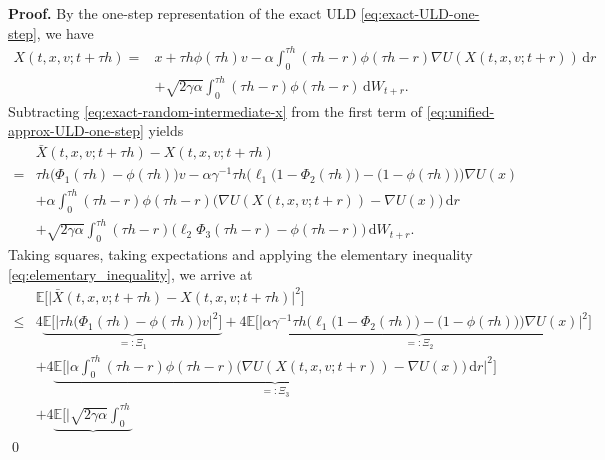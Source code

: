 \documentclass[12pt]{article}
\numberwithin{equation}{section}
\renewenvironment{proof}%
  {\begin{trivlist}%
   \item[]\ignorespaces}%
  {\qed\end{trivlist}}
\newcommand{\dd}{\mathrm{d}}
\begin{document}
\begin{proof}
\textbf{Proof.}
By the one-step representation of the exact ULD \eqref{eq:exact-ULD-one-step}, we have
\begin{equation}
\label{eq:exact-random-intermediate-x}
\begin{aligned}
X(t,x,v;t+\tau h)
=   &
x
+
\tau h\phi(\tau h)v
-
\alpha
\int_0^{\tau h}
(\tau h-r)\phi(\tau h-r)
\nabla U(X(t,x,v;t+r))\,\dd r
\\   &
+
\sqrt{2\gamma\alpha}
\int_0^{\tau h}
(\tau h-r)\phi(\tau h-r)\,\dd W_{t+r}.
\end{aligned}
\end{equation}
Subtracting \eqref{eq:exact-random-intermediate-x} from the first term of \eqref{eq:unified-approx-ULD-one-step} yields
\begin{equation}
\label{eq:delta-tau-x-decomposition}
\begin{aligned}
&
\bar X(t,x,v;t+\tau h)
-
X(t,x,v;t+\tau h)
\\
=&
\tau h
\big(
\Phi_1(\tau h)-\phi(\tau h)
\big)v
-
\alpha
\gamma^{-1}
\tau h
\Big(
\ell_1
\big(
1-\Phi_2(\tau h)
\big)
-
\big(
1-\phi(\tau h)
\big)
\Big)
\nabla U(x)
\\
&+
\alpha
\int_0^{\tau h}
(\tau h-r)\phi(\tau h-r)
\big(
\nabla U(X(t,x,v;t+r))-\nabla U(x)
\big)\,\dd r
\\
&+
\sqrt{2\gamma\alpha}
\int_0^{\tau h}
(\tau h-r)
\big(
\ell_2\Phi_3(\tau h-r)-\phi(\tau h-r)
\big)\,\dd W_{t+r}.
\end{aligned}
\end{equation}
Taking squares, taking expectations and applying the elementary inequality \eqref{eq:elementary_inequality}, we arrive at
\begin{align}
\label{eq:delta-tau-x-four-terms}
&
\mathbb E
\Big[
\big|
\bar X(t,x,v;t+\tau h)
-
X(t,x,v;t+\tau h)
\big|^2
\Big]
\nonumber\\
\leq&
4
\underbrace{
\mathbb E
\Big[
\big|
\tau h
\big(
\Phi_1(\tau h)-\phi(\tau h)
\big)v
\big|^2
\Big]
}_{=:\Xi_1}
+
4
\underbrace{
\mathbb E
\Big[
\Big|
\alpha
\gamma^{-1}
\tau h
\Big(
\ell_1
\big(
1-\Phi_2(\tau h)
\big)
-
\big(
1-\phi(\tau h)
\big)
\Big)
\nabla U(x)
\Big|^2
\Big]
}_{=:\Xi_2}
\nonumber\\
&+
4
\underbrace{
\mathbb E
\Big[
\Big|
\alpha
\int_0^{\tau h}
(\tau h-r)\phi(\tau h-r)
\big(
\nabla U(X(t,x,v;t+r))-\nabla U(x)
\big)\,\dd r
\Big|^2
\Big]
}_{=:\Xi_3}
\nonumber\\
&+
4
\underbrace{
\mathbb E
\Big[
\Big|
\sqrt{2\gamma\alpha}
\int_0^{\tau h}
}
\end{align}
\end{proof}
\end{document}
